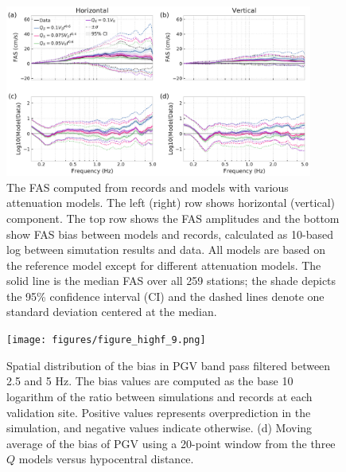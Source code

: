 \begin{figure}[!ht]
  \centering
  \includegraphics[width=0.9\textwidth,height=0.9\textheight,keepaspectratio]{figures/figure_highf_8.pdf}
  \caption{The FAS computed from records and models with various attenuation models. The left (right) row shows horizontal (vertical) component. The top row shows the FAS amplitudes and the bottom show FAS bias between models and records, calculated as 10-based log between simutation results and data. All models are based on the reference model except for different attenuation models. The solid line is the median FAS over all 259 stations; the shade depicts the 95\% confidence interval (CI) and the dashed lines denote one standard deviation centered at the median.
  }
  \label{fig:highf-8}
\end{figure}
\clearpage

\begin{figure}[!ht]
  \centering
  \texttt{[image: figures/figure\_highf\_9.png]}
  \caption{Spatial distribution of the bias in PGV band pass filtered between 2.5 and 5 Hz. The bias values are computed as the base 10 logarithm of the ratio between simulations and records at each validation site. Positive values represents overprediction in the simulation, and negative values indicate otherwise. (d) Moving average of the bias of PGV using a 20-point window from the three $Q$ models versus hypocentral distance.
  }
  \label{fig:highf-9}
\end{figure}
\clearpage

